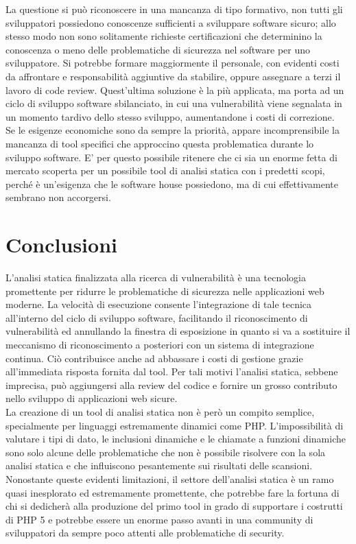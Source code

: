 La questione si può riconoscere in una mancanza di tipo formativo, non tutti gli sviluppatori possiedono conoscenze sufficienti a sviluppare software sicuro; allo stesso modo non sono solitamente richieste certificazioni che determinino la conoscenza o meno delle problematiche di sicurezza nel software per uno sviluppatore. Si potrebbe formare maggiormente il personale, con evidenti costi da affrontare e responsabilità aggiuntive da stabilire, oppure assegnare a terzi il lavoro di code review. Quest'ultima soluzione è la più applicata, ma porta ad un ciclo di sviluppo software sbilanciato, in cui una vulnerabilità viene segnalata in un momento tardivo dello stesso sviluppo, aumentandone i costi di correzione.\\
Se le esigenze economiche sono da sempre la priorità, appare incomprensibile la mancanza di tool specifici che approccino questa problematica durante lo sviluppo software. E' per questo possibile ritenere che ci sia un enorme fetta di mercato scoperta per un possibile tool di analisi statica con i predetti scopi, perché è un'esigenza che le software house possiedono, ma di cui effettivamente sembrano non accorgersi.
  

\chapter{Conclusioni}
L'analisi statica finalizzata alla ricerca di vulnerabilità è una tecnologia promettente per ridurre le problematiche di sicurezza nelle applicazioni web moderne. La velocità di esecuzione consente l'integrazione di tale tecnica all'interno del ciclo di sviluppo software, facilitando il riconoscimento di vulnerabilità ed annullando la finestra di esposizione in quanto si va a sostituire il meccanismo di riconoscimento a posteriori con un sistema di integrazione continua. Ciò contribuisce anche ad abbassare i costi di gestione grazie all'immediata risposta fornita dal tool.
Per tali motivi l'analisi statica, sebbene imprecisa, può aggiungersi alla review del codice e fornire un grosso contributo nello sviluppo di applicazioni web sicure.\\
La creazione di un tool di analisi statica non è però un compito semplice, specialmente per linguaggi estremamente dinamici come PHP. L'impossibilità di valutare i tipi di dato, le inclusioni dinamiche e le chiamate a funzioni dinamiche sono solo alcune delle problematiche che non è possibile risolvere con la sola analisi statica e che influiscono pesantemente sui risultati delle scansioni.\\
Nonostante queste evidenti limitazioni, il settore dell'analisi statica è un ramo quasi inesplorato ed estremamente promettente, che potrebbe fare la fortuna di chi si dedicherà alla produzione del primo tool in grado di supportare i costrutti di PHP 5 e potrebbe essere un enorme passo avanti in una community di sviluppatori da sempre poco attenti alle problematiche di security.